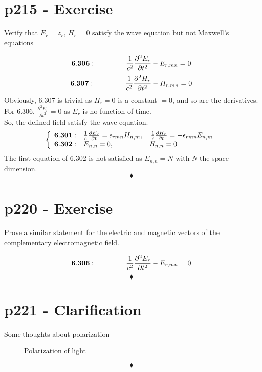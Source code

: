 \section{p215 - Exercise}
\begin{tcolorbox}
Verify that $E_r=z_r, \ H_r=0$ satisfy the wave equation but not Maxwell's equations
\end{tcolorbox}
$$\mathbf{6.306}: \spatie \ \frac{1}{c^2}\frac{\partial^2E_r}{\partial t^2} -E_{r,mn} = 0$$
$$\mathbf{6.307}: \spatie \ \frac{1}{c^2}\frac{\partial^2H_r}{\partial t^2} -H_{r,mn} = 0$$
Obviously, $\mathbf{6.307}$ is trivial as $H_r=0$ is a constant $=0$, and so are the derivatives.\\
For $\mathbf{6.306}$, $ \frac{\partial^2E_r}{\partial t^2}= 0$ as $E_r$ is no function of time.\\
So, the defined field satisfy the wave equation.\\
\begin{align}
\left\{ \begin{array}{ll}
\mathbf{6.301}: &\frac{1}{c}\frac{\partial E_r}{\partial t} = \epsilon_{rmn}H_{n,m}, \quad  \frac{1}{c}\frac{\partial H_r}{\partial t}= -\epsilon_{rmn}E_{n,m}\\
\mathbf{6.302}: & E_{n,n}=0, \quad\quad\quad\quad \quad H_{n,n}=0
\end{array}\right.
\end{align}
The first equation of $\mathbf{6.302}$ is not satisfied as $E_{n,n}= N$ with $N$ the space dimension.
 $$\blacklozenge$$
\newpage

\section{p220 - Exercise}
\begin{tcolorbox}
Prove a similar statement for the electric and magnetic vectors of the complementary electromagnetic field.
\end{tcolorbox}
$$\mathbf{6.306}: \spatie \ \frac{1}{c^2}\frac{\partial^2E_r}{\partial t^2} -E_{r,mn} = 0$$
 $$\blacklozenge$$
\newpage

\section{p221 - Clarification}
\begin{tcolorbox}
Some thoughts about polarization
\end{tcolorbox}


\begin{figure}[H]%
    \centering
    \subfloat[]{}
    \quad
        \subfloat[]{}
    \quad
        \subfloat[]{}
    \quad
\caption{Polarization of light}
\label{fig:fig_p221}
\end{figure}
 $$\blacklozenge$$
\newpage


